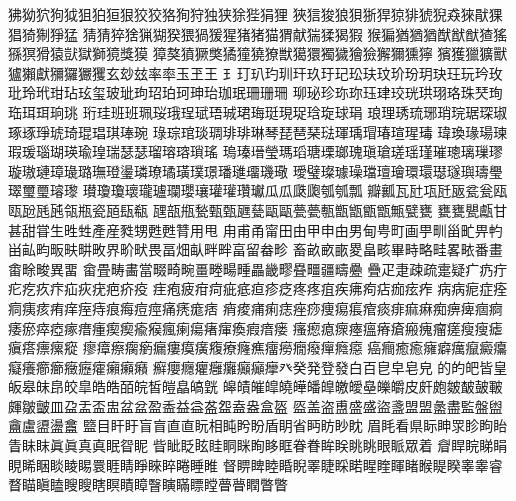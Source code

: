 狒󠄀狕󠄀狖󠄀狗󠄀狘󠄀狙󠄀狛󠄀狟󠄀狠󠄀狡󠄀狡󠄁狢󠄀狥󠄀狩󠄀独󠄀狭󠄀狳󠄀狴󠄀狷󠄀狸󠄀
狹󠄀狺󠄀狻󠄀狼󠄀狽󠄀狾󠄀猂󠄀猄󠄀猅󠄀猇󠄀猊󠄀猋󠄀猍󠄀猒󠄀猓󠄀猖󠄀猗󠄀猘󠄀猙󠄀猛󠄀
猜󠄀猜󠄁猝󠄀猞󠄀猟󠄀猢󠄀猤󠄀猥󠄀猧󠄀猨󠄀猩󠄀猪󠄀猪󠄁猫󠄀猬󠄀献󠄀猯󠄀猱󠄀猲󠄀猳󠄀
猴󠄀猵󠄀猶󠄀猶󠄁猶󠄂猷󠄀猷󠄁猷󠄂猹󠄀猺󠄀猻󠄀猽󠄀猾󠄀猿󠄀獃󠄀獄󠄀獅󠄀獍󠄀獎󠄀獏󠄀
獐󠄀獒󠄀獖󠄀獗󠄀獘󠄀獝󠄀獞󠄀獟󠄀獠󠄀獣󠄀獦󠄀獧󠄀獨󠄀獩󠄀獪󠄀獫󠄀獬󠄀獮󠄀獯󠄀獰󠄀
獱󠄀獲󠄀獵󠄀獷󠄀獸󠄀獹󠄀獺󠄀獻󠄀獼󠄀玀󠄀玁󠄀玃󠄀玄󠄀玅󠄀玆󠄀率󠄀率󠄁玉󠄀玊󠄀王󠄀
王󠄁玎󠄀玐󠄀玓󠄀玔󠄀玕󠄀玖󠄀玗󠄀玘󠄀玜󠄀玞󠄀玟󠄀玠󠄀玢󠄀玥󠄀玦󠄀玨󠄀玩󠄀玪󠄀玫󠄀
玭󠄀玲󠄀玳󠄀玵󠄀玷󠄀玹󠄀玺󠄀玻󠄀玼󠄀玽󠄀玿󠄀珀󠄀珂󠄀珅󠄀珆󠄀珈󠄀珉󠄀珊󠄀珊󠄁珊󠄂
珋󠄀珌󠄀珍󠄀珎󠄀珎󠄁珏󠄀珒󠄀珓󠄀珖󠄀珙󠄀珝󠄀珞󠄀珠󠄀珡󠄀珣󠄀珤󠄀珥󠄀珥󠄁珦󠄀珧󠄀
珩󠄀珪󠄀班󠄀班󠄁珮󠄀珱󠄀珴󠄀珵󠄀珷󠄀珸󠄀珹󠄀珺󠄀珻󠄀珽󠄀現󠄀珿󠄀琀󠄀琁󠄀球󠄀琄󠄀
琅󠄀理󠄀琇󠄀琉󠄀琊󠄀琑󠄀琓󠄀琚󠄀琛󠄀琡󠄀琢󠄀琢󠄁琤󠄀琥󠄀琦󠄀琨󠄀琩󠄀琪󠄀琫󠄀琬󠄀
琭󠄀琮󠄀琯󠄀琰󠄀琱󠄀琲󠄀琲󠄁琳󠄀琴󠄀琵󠄀琶󠄀琹󠄀琺󠄀琿󠄀瑀󠄀瑁󠄀瑃󠄀瑄󠄀瑆󠄀瑇󠄀
瑋󠄀瑍󠄀瑑󠄀瑒󠄀瑓󠄀瑕󠄀瑗󠄀瑙󠄀瑚󠄀瑛󠄀瑜󠄀瑝󠄀瑞󠄀瑟󠄀瑟󠄁瑠󠄀瑢󠄀瑢󠄁瑣󠄀瑤󠄀
瑦󠄀瑧󠄀瑨󠄀瑩󠄀瑪󠄀瑫󠄀瑭󠄀瑮󠄀瑯󠄀瑰󠄀瑱󠄀瑲󠄀瑳󠄀瑶󠄀瑾󠄀璀󠄀璁󠄀璃󠄀璅󠄀璆󠄀
璇󠄀璈󠄀璉󠄀璋󠄀璏󠄀璐󠄀璑󠄀璒󠄀璗󠄀璘󠄀璙󠄀璚󠄀璜󠄀璞󠄀璟󠄀璠󠄀璡󠄀璢󠄀璣󠄀璥󠄀
璦󠄀璧󠄀璨󠄀璩󠄀璪󠄀璫󠄀璮󠄀璯󠄀環󠄀環󠄁璱󠄀璲󠄀璵󠄀璹󠄀璺󠄀璻󠄀璽󠄀璽󠄁璿󠄀瓈󠄀
瓉󠄀瓊󠄀瓊󠄁瓌󠄀瓏󠄀瓐󠄀瓓󠄀瓔󠄀瓖󠄀瓘󠄀瓘󠄁瓚󠄀瓛󠄀瓜󠄀瓜󠄁瓞󠄀瓟󠄀瓠󠄀瓠󠄁瓢󠄀
瓣󠄀瓤󠄀瓦󠄀瓧󠄀瓨󠄀瓩󠄀瓪󠄀瓫󠄀瓮󠄀瓯󠄀瓯󠄁瓰󠄀瓱󠄀瓲󠄀瓴󠄀瓶󠄀瓷󠄀瓸󠄀瓺󠄀瓻󠄀
瓼󠄀瓿󠄀甁󠄀甃󠄀甄󠄀甄󠄁甅󠄀甆󠄀甌󠄀甌󠄁甍󠄀甍󠄁甎󠄀甑󠄀甑󠄁甑󠄂甑󠄃甒󠄀甓󠄀甕󠄀
甕󠄁甕󠄂甖󠄀甗󠄀甘󠄀甚󠄀甜󠄀甞󠄀生󠄀甠󠄀甡󠄀產󠄀産󠄀甤󠄀甥󠄀甦󠄀甦󠄁甧󠄀用󠄀甩󠄀
甪󠄀甫󠄀甬󠄀甯󠄀田󠄀由󠄀甲󠄀申󠄀甶󠄀男󠄀甸󠄀甹󠄀町󠄀画󠄀甼󠄀甽󠄀甾󠄀甿󠄀畀󠄀畃󠄀
畄󠄀畆󠄀畇󠄀畈󠄀畉󠄀畊󠄀畋󠄀界󠄀畍󠄀畎󠄀畏󠄀畐󠄀畑󠄀畒󠄀畔󠄀畔󠄁畗󠄀留󠄀畚󠄀畛󠄀
畜󠄀畝󠄀畝󠄁畞󠄀畟󠄀畠󠄀畡󠄀畢󠄀畤󠄀略󠄀畦󠄀畧󠄀畩󠄀番󠄀畫󠄀畬󠄀畭󠄀畯󠄀異󠄀畱󠄀
畲󠄀畳󠄀畴󠄀畵󠄀當󠄀畷󠄀畸󠄀畹󠄀畺󠄀畻󠄀畼󠄀畽󠄀畾󠄀畿󠄀疁󠄀疂󠄀疅󠄀疆󠄀疇󠄀疉󠄀
疊󠄀疋󠄀疌󠄀疎󠄀疏󠄀疐󠄀疑󠄀疒󠄀疓󠄀疔󠄀疕󠄀疙󠄀疚󠄀疜󠄀疝󠄀疢󠄀疣󠄀疤󠄀疥󠄀疫󠄀
疰󠄀疱󠄀疲󠄀疳󠄀疴󠄀疵󠄀疷󠄀疸󠄀疹󠄀疺󠄀疼󠄀疼󠄁疽󠄀疾󠄀疿󠄀痀󠄀痁󠄀痂󠄀痃󠄀痄󠄀
病󠄀病󠄁痆󠄀症󠄀痊󠄀痌󠄀痍󠄀痎󠄀痏󠄀痒󠄀痓󠄀痔󠄀痕󠄀痗󠄀痘󠄀痙󠄀痛󠄀痜󠄀痝󠄀痞󠄀
痟󠄀痠󠄀痡󠄀痢󠄀痣󠄀痤󠄀痧󠄀痩󠄀痬󠄀痮󠄀痯󠄀痰󠄀痱󠄀痲󠄀痳󠄀痴󠄀痹󠄀痺󠄀痼󠄀痾󠄀
痿󠄀瘀󠄀瘁󠄀瘂󠄀瘃󠄀瘄󠄀瘇󠄀瘈󠄀瘈󠄁瘉󠄀瘊󠄀瘋󠄀瘌󠄀瘍󠄀瘏󠄀瘒󠄀瘓󠄀瘕󠄀瘖󠄀瘘󠄀
瘙󠄀瘛󠄀瘜󠄀瘝󠄀瘞󠄀瘟󠄀瘠󠄀瘡󠄀瘢󠄀瘣󠄀瘤󠄀瘥󠄀瘦󠄀瘦󠄁瘧󠄀瘨󠄀瘩󠄀瘭󠄀瘰󠄀瘲󠄀
瘳󠄀瘴󠄀瘵󠄀瘸󠄀瘹󠄀瘺󠄀瘻󠄀瘼󠄀癀󠄀癁󠄀療󠄀癃󠄀癄󠄀癅󠄀癆󠄀癇󠄀癈󠄀癉󠄀癊󠄀癋󠄀
癌󠄀癎󠄀癒󠄀癒󠄁癕󠄀癖󠄀癘󠄀癙󠄀癜󠄀癟󠄀癡󠄀癢󠄀癤󠄀癤󠄁癥󠄀癧󠄀癨󠄀癩󠄀癩󠄁癪󠄀
癬󠄀癭󠄀癮󠄀癯󠄀癰󠄀癱󠄀癲󠄀癲󠄁癴󠄀癶󠄀癸󠄀発󠄀登󠄀發󠄀白󠄀百󠄀皀󠄀皁󠄀皂󠄀皃󠄀
的󠄀的󠄁皅󠄀皆󠄀皇󠄀皈󠄀皋󠄀皌󠄀皍󠄀皎󠄀皐󠄀皓󠄀皓󠄁皕󠄀皖󠄀皙󠄀皚󠄀皛󠄀皜󠄀皝󠄀
皞󠄀皟󠄀皠󠄀皡󠄀皢󠄀皣󠄀皤󠄀皥󠄀皦󠄀皧󠄀皨󠄀皪󠄀皭󠄀皮󠄀皯󠄀皰󠄀皴󠄀皶󠄀皷󠄀皸󠄀
皹󠄀皺󠄀皽󠄀皿󠄀盁󠄀盂󠄀盃󠄀盅󠄀盆󠄀盆󠄁盈󠄀盉󠄀益󠄀益󠄁盋󠄀盌󠄀盍󠄀盎󠄀盒󠄀盔󠄀
盔󠄁盖󠄀盗󠄀盙󠄀盛󠄀盛󠄁盜󠄀盞󠄀盟󠄀盟󠄁盠󠄀盡󠄀監󠄀盤󠄀盥󠄀盦󠄀盧󠄀盨󠄀盪󠄀盫󠄀
盬󠄀目󠄀盰󠄀盱󠄀盲󠄀盲󠄁直󠄀直󠄁盶󠄀相󠄀盹󠄀盻󠄀盼󠄀盾󠄀眀󠄀省󠄀眄󠄀眆󠄀眇󠄀眈󠄀
眉󠄀眊󠄀看󠄀県󠄀眎󠄀眒󠄀眔󠄀眕󠄀眗󠄀眙󠄀眚󠄀眛󠄀眜󠄀眞󠄀眞󠄁真󠄀真󠄁眠󠄀眢󠄀眤󠄀
眥󠄀眦󠄀眨󠄀眩󠄀眭󠄀眮󠄀眯󠄀眴󠄀眵󠄀眶󠄀眷󠄀眷󠄁眸󠄀眹󠄀眺󠄀眺󠄁眼󠄀眽󠄀眾󠄀着󠄀
睂󠄀睅󠄀睆󠄀睇󠄀睊󠄀睍󠄀睎󠄀睏󠄀睒󠄀睖󠄀睗󠄀睘󠄀睚󠄀睛󠄀睜󠄀睞󠄀睟󠄀睠󠄀睡󠄀睢󠄀
督󠄀睤󠄀睥󠄀睦󠄀睧󠄀睨󠄀睪󠄀睫󠄀睬󠄀睰󠄀睲󠄀睳󠄀睴󠄀睹󠄀睺󠄀睼󠄀睽󠄀睾󠄀睾󠄁睿󠄀
瞀󠄀瞄󠄀瞋󠄀瞌󠄀瞍󠄀瞍󠄁瞎󠄀瞑󠄀瞔󠄀瞕󠄀瞖󠄀瞚󠄀瞞󠄀瞟󠄀瞠󠄀瞢󠄀瞢󠄁瞤󠄀瞥󠄀瞥󠄁
